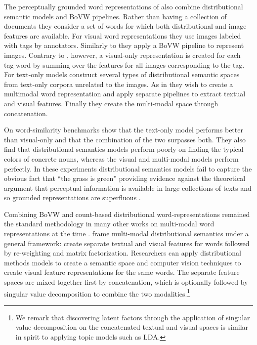 The perceptually grounded word representations of \cite{bruni2012distributional}
also combine distributional semantic models and BoVW pipelines.
Rather than having a collection of documents they consider a set of words for which
both distributional and image features are available. For visual word representations
they use images labeled with tags by annotators. Similarly to \cite{feng2010visual} they
apply a BoVW pipeline to represent images. Contrary to \cite{feng2010visual}, however,
a visual-only representation is created for each tag-word by summing over the features
for all images corresponding to the tag.
For text-only models \cite{bruni2012distributional} construct several types of distributional semantic spaces
from text-only corpora unrelated to the images.
As in \cite{feng2010visual} they wish to create a multimodal
word representation and apply separate pipelines to extract textual and visual
features. Finally they create the multi-modal space through concatenation.

On word-similarity benchmarks \cite{bruni2012distributional} show that the text-only model performs better than visual-only
and that the combination of the two surpasses both.
They also find that distributional semantics
models perform poorly on finding the typical colors of concrete nouns,
whereas the visual and multi-modal models perform perfectly. In these experiments
distributional semantics models fail to capture the obvious fact that ``the grass is green''
providing evidence against the theoretical argument that perceptual information is available in
large collections of texts and so grounded representations are superfluous \citep{louwerse2011symbol}.

Combining BoVW and count-based distributional word-representations remained the standard methodology
in many other works on multi-modal word representations at the time
\citep{bruni2011distributional,leong2011going,leong2011measuring}.
\cite{bruni2014multimodal} frame multi-modal distributional semantics under a general framework:
create separate textual and visual features for words followed by
re-weighting and matrix factorization. Researchers can apply distributional methods
models to create a semantic space and computer vision techniques to create
visual feature representations for the same words. The separate feature spaces
are mixed together  first  by concatenation, which is
optionally followed by singular value decomposition
to combine the two modalities.\footnote{We remark that discovering latent factors through the application
of singular value decomposition on the concatenated textual and visual spaces is similar in spirit
to applying topic models such as LDA.}

